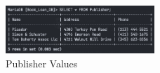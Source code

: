 \documentclass{article}
\begin{document}
\begin{figure}[h!]
    \centering
    \includegraphics[width=0.5\textwidth]{images/table-publisher-entries.png}
    \caption{Publisher Values}
    \label{fig:table-publisher}
\end{figure}
\end{document}
